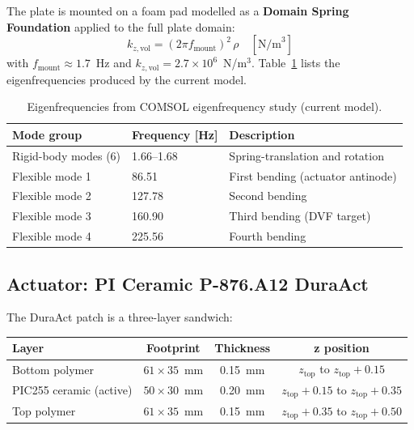 \documentclass[12pt,a4paper]{article}
\begin{document}
The plate is mounted on a foam pad modelled as a
\textbf{Domain Spring Foundation} applied to the full plate domain:
\begin{equation}
  k_{z,\text{vol}} = (2\pi f_\text{mount})^2\,\rho \quad [\text{N/m}^3]
  \label{eq:spring_vol}
\end{equation}
with $f_\text{mount} \approx 1.7$~Hz and $k_{z,\text{vol}} = 2.7\times10^6$~N/m$^3$.
Table~\ref{tab:eig} lists the eigenfrequencies produced by the current model.

\begin{table}[h]
\centering
\caption{Eigenfrequencies from COMSOL eigenfrequency study (current model).}
\label{tab:eig}
\begin{tabular}{lll}
\toprule
Mode group & Frequency [Hz] & Description \\
\midrule
Rigid-body modes (6) & 1.66--1.68 & Spring-translation and rotation \\
Flexible mode 1      & 86.51      & First bending (actuator antinode) \\
Flexible mode 2      & 127.78     & Second bending \\
Flexible mode 3      & 160.90     & Third bending (DVF target) \\
Flexible mode 4      & 225.56     & Fourth bending \\
\bottomrule
\end{tabular}
\end{table}

\subsection{Actuator: PI Ceramic P-876.A12 DuraAct}
\label{sec:actuator}

The DuraAct patch is a three-layer sandwich:
\begin{center}
\begin{tabular}{lccc}
\toprule
Layer & Footprint & Thickness & z position \\
\midrule
Bottom polymer & $61\times35$~mm & 0.15~mm & $z_\text{top}$ to $z_\text{top}+0.15$ \\
PIC255 ceramic (active) & $50\times30$~mm & 0.20~mm & $z_\text{top}+0.15$ to $z_\text{top}+0.35$ \\
Top polymer & $61\times35$~mm & 0.15~mm & $z_\text{top}+0.35$ to $z_\text{top}+0.50$ \\
\bottomrule
\end{tabular}
\end{center}
\end{document}
